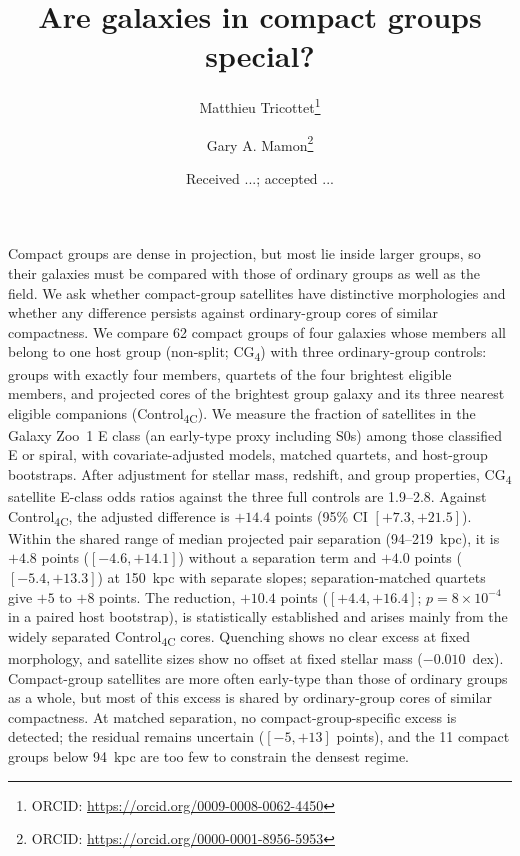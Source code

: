\documentclass{aa}
\newcommand{\CC}{Control\textsubscript{4C}}
\newcommand{\CG}{CG\textsubscript{4}}
\begin{document}
\nolinenumbers
\title{Are galaxies in compact groups special?}

   \author{Matthieu Tricottet\thanks{ORCID: \url{https://orcid.org/0009-0008-0062-4450}}
           \and Gary A. Mamon\thanks{ORCID: \url{https://orcid.org/0000-0001-8956-5953}}
           }


  \date{Received ...; accepted ...}














  \abstract
  {Compact groups are dense in projection, but most lie inside larger groups, so their galaxies must be compared with those of ordinary groups as well as the field.}
  {We ask whether compact-group satellites have distinctive morphologies and whether any difference persists against ordinary-group cores of similar compactness.}
  {We compare 62 compact groups of four galaxies whose members all belong to one host group (non-split; \CG) with three ordinary-group controls: groups with exactly four members, quartets of the four brightest eligible members, and projected cores of the brightest group galaxy and its three nearest eligible companions (\CC). We measure the fraction of satellites in the Galaxy Zoo~1 E class (an early-type proxy including S0s) among those classified E or spiral, with covariate-adjusted models, matched quartets, and host-group bootstraps.}
  {After adjustment for stellar mass, redshift, and group properties, \CG{} satellite E-class odds ratios against the three full controls are 1.9--2.8. Against \CC{}, the adjusted difference is \(+14.4\) points (95\% CI \([+7.3, +21.5]\)). Within the shared range of median projected pair separation (94--219~kpc), it is \(+4.8\) points (\([-4.6, +14.1]\)) without a separation term and \(+4.0\) points (\([-5.4, +13.3]\)) at 150~kpc with separate slopes; separation-matched quartets give \(+5\) to \(+8\) points. The reduction, \(+10.4\) points (\([+4.4, +16.4]\); \(p = 8\times 10^{-4}\) in a paired host bootstrap), is statistically established and arises mainly from the widely separated \CC{} cores. Quenching shows no clear excess at fixed morphology, and satellite sizes show no offset at fixed stellar mass (\(-0.010\)~dex).}
  {Compact-group satellites are more often early-type than those of ordinary groups as a whole, but most of this excess is shared by ordinary-group cores of similar compactness. At matched separation, no compact-group-specific excess is detected; the residual remains uncertain (\([-5, +13]\) points), and the 11 compact groups below 94~kpc are too few to constrain the densest regime.}
\end{document}
